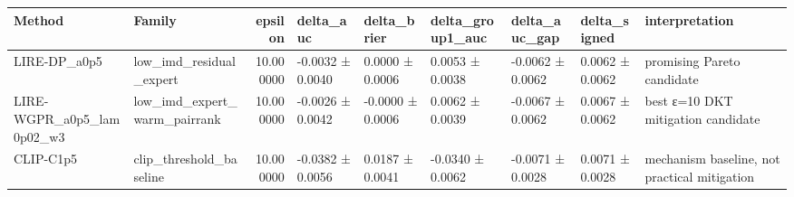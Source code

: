 \begin{tabular}{llrllllll}
\toprule
Method & Family & epsilon & delta_auc & delta_brier & delta_group1_auc & delta_auc_gap & delta_signed & interpretation \\
\midrule
LIRE-DP_a0p5 & low_imd_residual_expert & 10.000000 & -0.0032 ± 0.0040 & 0.0000 ± 0.0006 & 0.0053 ± 0.0038 & -0.0062 ± 0.0062 & 0.0062 ± 0.0062 & promising Pareto candidate \\
LIRE-WGPR_a0p5_lam0p02_w3 & low_imd_expert_warm_pairrank & 10.000000 & -0.0026 ± 0.0042 & -0.0000 ± 0.0006 & 0.0062 ± 0.0039 & -0.0067 ± 0.0062 & 0.0067 ± 0.0062 & best ε=10 DKT mitigation candidate \\
CLIP-C1p5 & clip_threshold_baseline & 10.000000 & -0.0382 ± 0.0056 & 0.0187 ± 0.0041 & -0.0340 ± 0.0062 & -0.0071 ± 0.0028 & 0.0071 ± 0.0028 & mechanism baseline, not practical mitigation \\
\bottomrule
\end{tabular}
